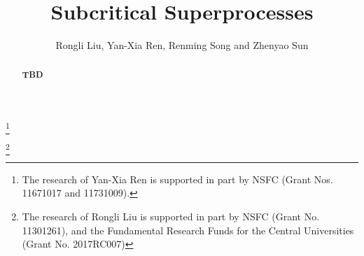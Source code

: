 \documentclass[12pt,a4paper]{amsart}
\numberwithin{equation}{section}
\theoremstyle{plain}
\theoremstyle{definition}
\begin{document}
\title {Subcritical Superprocesses }
\author
[R. Liu, Y.-X. Ren, R. Song and Z. Sun]
{
  Rongli Liu, Yan-Xia Ren, Renming Song and Zhenyao Sun}
\address{
  Yan-Xia Ren\\
  School of Mathematical Sciences\\
  Peking University\\
  Beijing, P. R. China, 100871}
\thanks{
  The research of Yan-Xia Ren is supported in part by NSFC (Grant Nos. 11671017 and 11731009).}
\address{
  Rongli Liu\\
  Information about Rongli Liu}
\thanks{
  The research of Rongli Liu is supported in part by NSFC
  (Grant No. 11301261), and the Fundamental Research Funds for the Central Universities (Grant No.  2017RC007)}
\address{
  Zhenyao Sun\\
  School of Mathematical Sciences\\
  Peking University\\
  Beijing, P. R. China, 100871}
\begin{abstract}
\begin{comment}
	In this paper, we discussed the decay rate of the extinction probability of a class of superdiffusions.
  Two different conditional limits, the Yaglom probability and the Q process, are considered.
  We characterize the Yaglom distribution by some function $G(f)$, which satisfies $G(v^t(0,\cdot))=t$ for each $t>0$ and where $v^t(0,x)=-\log(\mathbb P_x(\zeta<t))$.
  It is proved that the Yaglom distribution is the minimal quasi-stationary distribution.
  As for the Q process, we show that under finite LlogL moment assumptions, the Q process has the equilibrium distribution.
  And it is a size-biased Yaglom distribution.
  Moreover, we point out that under some conditional distribution the equilibrium  distribution is an infinitely divisible distribution.
\end{comment}
{\bf TBD}
\end{abstract}
\maketitle
\end{document}
